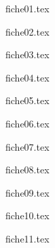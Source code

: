 \documentclass[11pt,a4paper]{report}
\begin{document}
\vspace*{2cm}

\newpage



{fiche01.tex}
\newpage

{fiche02.tex}
\newpage

{fiche03.tex}
\newpage

{fiche04.tex}
\newpage

{fiche05.tex}
\newpage

{fiche06.tex}
\newpage

{fiche07.tex}
\newpage

{fiche08.tex}
\newpage

{fiche09.tex}
\newpage

{fiche10.tex}
\newpage

{fiche11.tex}
\newpage


\end{document}
